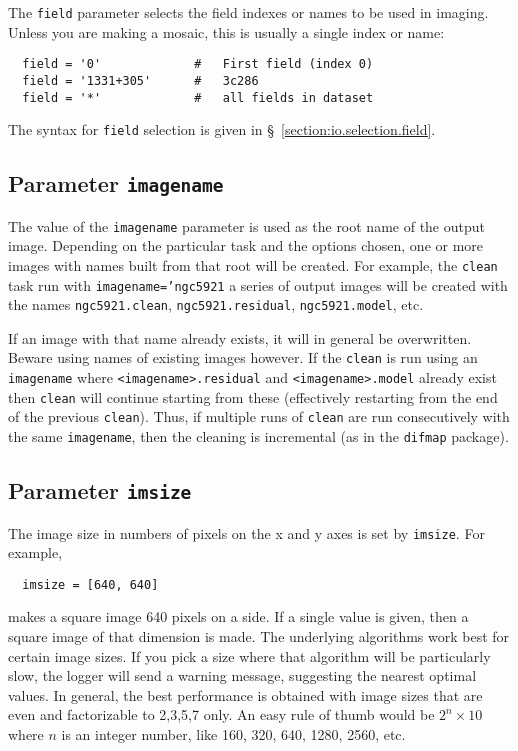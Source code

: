 The {\tt field} parameter selects the field indexes or names
to be used in imaging.  Unless you are making a mosaic, this
is usually a single index or name:
\small
\begin{verbatim}
  field = '0'             #   First field (index 0)
  field = '1331+305'      #   3c286
  field = '*'             #   all fields in dataset
\end{verbatim}
\normalsize

The syntax for {\tt field} selection is given in 
\S~\ref{section:io.selection.field}.

\subsection{Parameter {\tt imagename} }
\label{section:im.pars.imagename}

The value of the {\tt imagename} parameter is used as the root name
of the output image.  Depending on the particular task and the
options chosen, one or more images with names built from that root
will be created.  
For example, the {\tt clean} task run with
{\tt imagename='ngc5921} 
a series of output images will be created with the names
{\tt ngc5921.clean}, {\tt ngc5921.residual}, {\tt ngc5921.model}, etc.

If an image with that name already exists, it will in general
be overwritten.  Beware using names of existing images however.
If the {\tt clean} is run using an {\tt imagename} where 
{\tt <imagename>.residual} and {\tt <imagename>.model} already
exist then {\tt clean} will continue starting from these
(effectively restarting from the end of the previous {\tt clean}). 
Thus, if multiple runs of {\tt clean} are run consecutively
with the same {\tt imagename}, then the cleaning is incremental
(as in the {\tt difmap} package).

\subsection{Parameter {\tt imsize} }
\label{section:im.pars.imsize}

The image size in numbers of pixels on the x and y axes is
set by {\tt imsize}.  For example,
\small
\begin{verbatim}
  imsize = [640, 640]
\end{verbatim}
\normalsize makes a square image 640 pixels on a side.  If a single
value is given, then a square image of that dimension is made.  The
underlying algorithms work best for certain image sizes. If you pick a
size where that algorithm will be particularly slow, the logger will
send a warning message, suggesting the nearest optimal values. In
general, the best performance is obtained with image sizes that are
even and factorizable to 2,3,5,7 only. An easy rule of thumb would be
$2^{n}\times10$ where $n$ is an integer number, like 160, 320, 640,
1280, 2560, etc.



